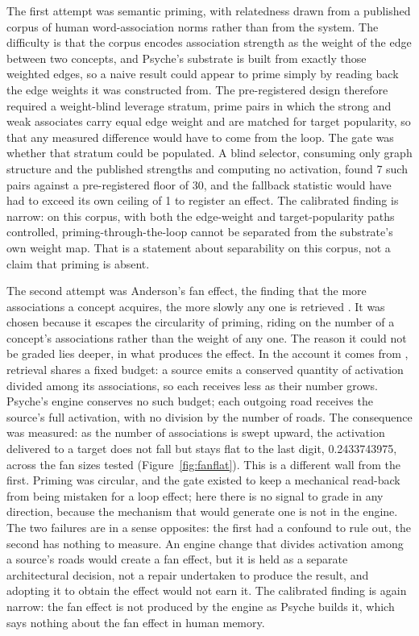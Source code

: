 \documentclass[conference]{IEEEtran}
\begin{document}
The first attempt was semantic priming, with relatedness drawn from a published corpus of
human word-association norms \cite{dedeyne2019swow} rather than from the system. The
difficulty is that the corpus encodes association strength as the weight of the edge between
two concepts, and Psyche's substrate is built from exactly those weighted edges, so a naive
result could appear to prime simply by reading back the edge weights it was constructed from.
The pre-registered design therefore required a weight-blind leverage stratum, prime pairs in
which the strong and weak associates carry equal edge weight and are matched for target
popularity, so that any measured difference would have to come from the loop. The gate was
whether that stratum could be populated. A blind selector, consuming only graph structure and
the published strengths and computing no activation, found 7 such pairs against a
pre-registered floor of 30, and the fallback statistic would have had to exceed its own
ceiling of 1 to register an effect. The calibrated finding is narrow: on this corpus, with
both the edge-weight and target-popularity paths controlled, priming-through-the-loop cannot
be separated from the substrate's own weight map. That is a statement about separability on
this corpus, not a claim that priming is absent.

The second attempt was Anderson's fan effect, the finding that the more associations a concept
acquires, the more slowly any one is retrieved \cite{anderson1974retrieval,
andersonreder1999fan}. It was chosen because it escapes the circularity of priming, riding on
the number of a concept's associations rather than the weight of any one. The reason it could
not be graded lies deeper, in what produces the effect. In the account it comes from
\cite{anderson1998atomic}, retrieval shares a fixed budget: a source emits a conserved quantity
of activation divided among its associations, so each receives less as their number grows.
Psyche's engine conserves no such budget; each outgoing road receives the source's full
activation, with no division by the number of roads. The consequence was measured: as the
number of associations is swept upward, the activation delivered to a target does not fall but
stays flat to the last digit, 0.2433743975, across the fan sizes tested
(Figure~\ref{fig:fanflat}). This is a different wall from the first. Priming was circular, and
the gate existed to keep a mechanical read-back from being mistaken for a loop effect; here
there is no signal to grade in any direction, because the mechanism that would generate one is
not in the engine. The two failures are in a sense opposites: the first had a confound to rule
out, the second has nothing to measure. An engine change that divides activation among a
source's roads would create a fan effect, but it is held as a separate architectural decision,
not a repair undertaken to produce the result, and adopting it to obtain the effect would not
earn it. The calibrated finding is again narrow: the fan effect is not produced by the engine
as Psyche builds it, which says nothing about the fan effect in human memory.
\end{document}
